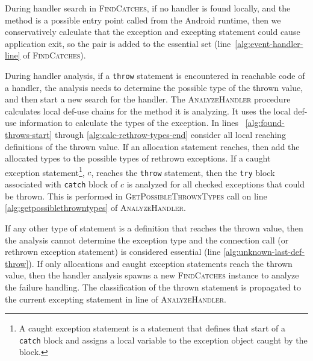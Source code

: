 During handler search in \textsc{FindCatches}, if no handler is found
locally, and the method is a possible entry point called from the
Android runtime, then we conservatively calculate that the exception
and excepting statement could cause application exit, so the pair is
added to the essential set (line~\ref{alg:event-handler-line} of
\textsc{FindCatches}). 

During handler analysis, if a \lstinline!throw! statement is
encountered in reachable code of a handler, the analysis needs to
determine the possible type of the thrown value, and then start a new
search for the handler.  The \textsc{AnalyzeHandler} procedure
calculates local def-use chains for the method it is analyzing.  It
uses the local def-use information to calculate the types of the
exception.  In lines ~\ref{alg:found-throws-start} through
\ref{alg:calc-rethrow-types-end} consider all local reaching
definitions of the thrown value.  If an allocation statement reaches,
then add the allocated types to the possible types of rethrown
exceptions. If a caught exception statement\footnote{A caught
  exception statement is a statement that defines that start of a
  \lstinline!catch! block and assigns a local variable to the
  exception object caught by the block.}, $c$, reaches the
\lstinline!throw! statement, then the 
\lstinline!try! block associated with \lstinline!catch! block of
$c$ is analyzed for all checked exceptions that could be thrown.  This
is performed in \textsc{GetPossibleThrownTypes} call on 
line \ref{alg:getpossiblethrowntypes} of \textsc{AnalyzeHandler}.

If any other type of statement is a definition that reaches the thrown
value, then the analysis cannot determine the exception type and the
connection call (or rethrown exception statement) is considered
essential (line \ref{alg:unknown-last-def-throw}).  If only
allocations and caught exception statements reach the thrown value,
then the handler analysis spawns a new \textsc{FindCatches} instance
to analyze the failure handling.  The classification of the thrown
statement is propagated to the current excepting statement in
line \label{alg:progagate-line} of \textsc{AnalyzeHandler}.

